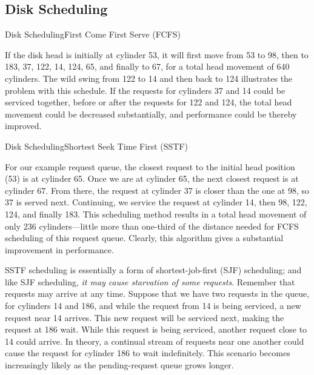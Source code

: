 \subsection{Disk Scheduling}

\begin{frame}{Disk Scheduling}{First Come First Serve (FCFS)}
  \begin{center}
     
  \end{center}
\end{frame}

If the disk head is initially at cylinder 53, it will ﬁrst move from 53 to 98, then to
183, 37, 122, 14, 124, 65, and ﬁnally to 67, for a total head movement of 640
cylinders. The wild swing from 122 to 14 and then back to 124 illustrates the problem with
this schedule. If the requests for cylinders 37 and 14 could be serviced together, before
or after the requests for 122 and 124, the total head movement could be decreased
substantially, and performance could be thereby improved.

\begin{frame}{Disk Scheduling}{Shortest Seek Time First (SSTF)}
  \begin{center}
     
  \end{center}
\end{frame}

For our example request queue, the closest request to the initial head position (53) is at
cylinder 65. Once we are at cylinder 65, the next closest request is at cylinder 67. From
there, the request at cylinder 37 is closer than the one at 98, so 37 is served
next. Continuing, we service the request at cylinder 14, then 98, 122, 124, and ﬁnally
183. This scheduling method results in a total head movement of only 236 cylinders—little
more than one-third of the distance needed for FCFS scheduling of this request
queue. Clearly, this algorithm gives a substantial improvement in
performance.

SSTF scheduling is essentially a form of shortest-job-ﬁrst (SJF) scheduling; and like SJF
scheduling, \emph{it may cause starvation of some requests}. Remember that requests may
arrive at any time. Suppose that we have two requests in the queue, for cylinders 14 and
186, and while the request from 14 is being serviced, a new request near 14 arrives. This
new request will be serviced next, making the request at 186 wait. While this request is
being serviced, another request close to 14 could arrive. In theory, a continual stream of
requests near one another could cause the request for cylinder 186 to wait indeﬁnitely.
This scenario becomes increasingly likely as the pending-request queue grows longer.

